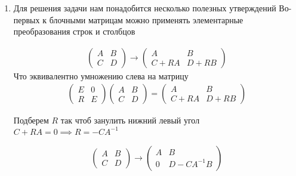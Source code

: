 \begin{sol}
    \begin{enumerate}
        \item 
   
        Для решения задачи нам понадобится несколько полезных утверждений
        Во-первых к блочными матрицам можно применять элементарные преобразования
        строк и столбцов
    
        \begin{gather*}
            \left(
            \begin{array}{cc}
               A &  B \\
               C &  D
            \end{array}\right) \rightarrow \left(
            \begin{array}{cc}
               A &  B \\
               C + RA &  D +RB
            \end{array}\right)
        \end{gather*}
        Что эквивалентно умножению слева на матрицу
        \begin{gather*}
            \left(
            \begin{array}{cc}
                   E &  0 \\
                   R &  E
            \end{array}\right)
            \left(
            \begin{array}{cc}
               A &  B \\
               C &  D 
            \end{array}\right)
            =\left(
            \begin{array}{cc}
               A &  B \\
               C + RA &  D +RB
            \end{array}\right)
        \end{gather*}
        
        Подберем $R$ так чтоб занулить нижний левый угол
        $C +  RA = 0 \implies R = -C A^{-1}$
        
        \begin{gather*}
            \left(
            \begin{array}{cc}
               A &  B \\
               C &  D 
            \end{array}\right) \rightarrow 
             \left(
            \begin{array}{cc}
               A &  B \\
               0 &  D - C A^{-1}B
            \end{array}\right)
        \end{gather*}
        

\end{enumerate}
\end{sol}
